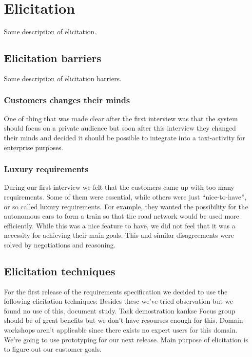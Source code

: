 \documentclass[10pt]{article}
\begin{document}
\section{Elicitation}
\sloppy
\noindent Some description of elicitation.
\subsection{Elicitation barriers}
Some description of elicitation barriers.
\subsubsection{Customers changes their minds}
One of thing that was made clear after the first interview was that the system should focus on a private audience but soon after this interview they changed their minds and decided it should be possible to integrate into a taxi-activity for enterprise purposes.
\subsubsection{Luxury requirements}
During our first interview we felt that the customers came up with too many requirements. Some of them were essential, while others were just “nice-to-have”, or so called luxury requirements. For example, they wanted the possibility for the autonomous cars to form a train so that the road network would be used more efficiently. While this was a nice feature to have, we did not feel that it was a necessity for achieving their main goals. This and similar disagreements were solved by negotiations and reasoning. 

\subsection{Elicitation techniques}
For the first release of the requirements specification we decided to use the following elicitation techniques:
Besides these we’ve tried observation but we found no use of this, document study.
Task demostration kankse
Focus group should be of great benefits but we don’t have resourses enough for this.
Domain workshops aren’t applicable since there exists no expert users for this domain.
We’re going to use prototyping for our next release.
Main purpose of elicitation is to figure out our customer goals.
\end{document}
